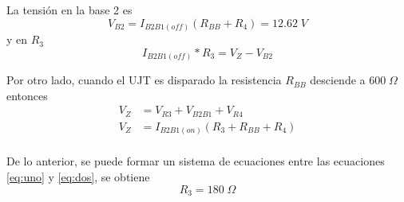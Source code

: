 \documentclass{article}
\begin{document}
La tensión en la base 2 es
\[ V_{B2} = I_{B2B1(off)} (R_{BB} + R_4) = 12.62 \; V \]
y en $R_3$
\[ I_{B2B1(off)} * R_3 = V_Z - V_{B2} \] \label{eq:uno} 

Por otro lado, cuando el UJT es disparado la resistencia $R_{BB}$ desciende a $600 \; \Omega$ entonces
\begin{align*}
V_Z &= V_{R3} + V_{B2B1} + V_{R4} \\
V_Z &= I_{B2B1(on)} (R_3 + R_{BB} + R_4)\\ \label{eq:dos}
\end{align*}

De lo anterior, se puede formar un sistema de ecuaciones entre las ecuaciones \ref{eq:uno} y \ref{eq:dos}, se obtiene
\[ R_3 = 180 \; \Omega \]
\end{document}
